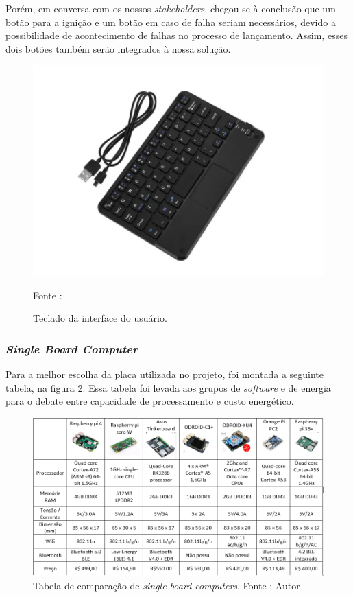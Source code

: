 Porém, em conversa com os nossos  \textit{stakeholders}, chegou-se à conclusão que um botão para a ignição e um botão em caso de falha seriam necessários, devido a possibilidade de acontecimento de falhas no processo de lançamento. Assim, esses dois botões também serão integrados à nossa solução.




\begin{figure}[H]
  \centering
  \includegraphics[scale=0.5]{figuras/TecladoPI2.png}
  \caption{Teclado da interface do usuário.}
  {\footnotesize Fonte : \cite{figura_Teclado}} 
  \label{fig:Teclado}
\end{figure}

\subsubsection{ \textit{Single Board Computer}}

Para a melhor escolha da placa utilizada no projeto, foi montada a seguinte tabela, na figura \ref{fig:comparacaoMicro}. Essa tabela foi levada aos grupos de \textit{software} e de energia para o debate entre capacidade de processamento e custo energético.

\begin{figure}[H]
  \centering
  \includegraphics[scale=0.8]{figuras/SBCcomparacao.png}
  \caption{Tabela de comparação de \textit{single board computers}. Fonte : Autor } 
  \label{fig:comparacaoMicro}
\end{figure}

